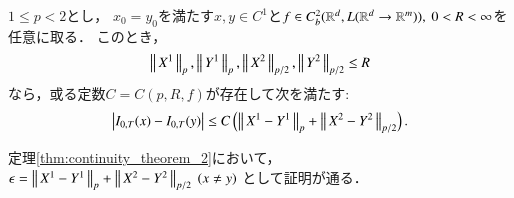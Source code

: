 	\begin{screen}
		\begin{cor}\label{cor:continuity_theorem_2}
			$1 \leq p < 2$とし，
			$x_0 = y_0$を満たす$x,y \in C^1$と$f \in C^2_b(\mathbb{R}^d,L(\mathbb{R}^d \rightarrow \mathbb{R}^m)),\ 0 < R < \infty$を任意に取る．
			このとき，
			\begin{align}
				\left\|\, X^1\, \right\|_{p},\left\|\, Y^1\, \right\|_{p}, \left\|\, X^2\, \right\|_{p/2},\left\|\, Y^2\, \right\|_{p/2} \leq R
			\end{align}
			なら，或る定数$C = C(p,R,f)$が存在して次を満たす:
			\begin{align}
				\left| I_{0,T}(x) - I_{0,T}(y) \right| \leq C\left( \left\|\, X^1 - Y^1\, \right\|_{p}+\left\|\, X^2 - Y^2\, \right\|_{p/2} \right).
			\end{align}
		\end{cor}
	\end{screen}
	
	\begin{prf}
		定理\ref{thm:continuity_theorem_2}において，
		$\epsilon = \left\|\, X^1 - Y^1\, \right\|_{p} + \left\|\, X^2 - Y^2\, \right\|_{p/2}\ (x \neq y)$
		として証明が通る．
		\QED
	\end{prf}
	
